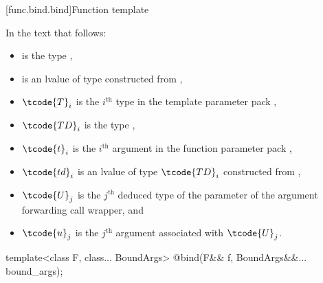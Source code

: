 [func.bind.bind]{Function template }

\pnum
In the text that follows:

\begin{itemize}
\item {} is the type ,
\item {} is an lvalue of type  constructed from ,
\item $\tcode{T}_i$ is the $i^\text{th}$ type in the template parameter pack ,
\item $\tcode{TD}_i$ is the type ,
\item $\tcode{t}_i$ is the $i^\text{th}$ argument in the function parameter pack ,
\item $\tcode{td}_i$ is an lvalue of type $\tcode{TD}_i$ constructed from ,
\item $\tcode{U}_j$ is the $j^\text{th}$ deduced type of the  parameter
  of the argument forwarding call wrapper, and
\item $\tcode{u}_j$ is the $j^\text{th}$ argument associated with $\tcode{U}_j$.
\end{itemize}

%
\begin{itemdecl}
template<class F, class... BoundArgs>
  @\unspec@ bind(F&& f, BoundArgs&&... bound_args);
\end{itemdecl}

